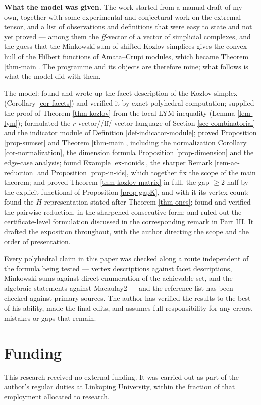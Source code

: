 \documentclass[11pt, a4paper, abstract=yes]{scrartcl}
\theoremstyle{definition}
\theoremstyle{remark}
\theoremstyle{plain}
\begin{document}
\textbf{What the model was given.} The work started from a manual draft of my own, together with some
experimental and conjectural work on the extremal tensor, and a list of observations and
definitions that were easy to state and not yet proved --- among them the \emph{ff}-vector of a vector
of simplicial complexes, and the guess that the Minkowski sum of shifted Kozlov simplices gives the
convex hull of the Hilbert functions of Amata--Crupi modules, which became Theorem \ref{thm-main}.
The programme and its objects are therefore mine; what follows is what the model did with them.

The model: found and wrote up the facet description of the Kozlov simplex (Corollary \ref{cor-facets})
and verified it by exact polyhedral computation; supplied the proof of Theorem \ref{thm-kozlov} from the
local LYM inequality (Lemma \ref{lem-lym}); formulated the \(r\)-vector//ff/-vector language of
Section \ref{sec-combinatorial} and the indicator module of Definition \ref{def-indicator-module}; proved
Proposition \ref{prop-sumset} and Theorem \ref{thm-main}, including the normalization
Corollary \ref{cor-normalization}, the dimension formula Proposition \ref{prop-dimension} and the edge-case
analysis; found Example \ref{ex-nonids}, the sharper Remark \ref{rem-ac-reduction} and
Proposition \ref{prop-in-ids}, which together fix the scope of the main theorem; and proved Theorem \ref{thm-kozlov-matrix} in full, the
gap-\(\ge2\) half by the explicit functional of Proposition \ref{prop-gapK}, and with it
its vertex count; found the \(H\)-representation stated after Theorem \ref{thm-ones}; found and
verified the pairwise reduction, in the sharpened consecutive form; and ruled out the
certificate-level formulation discussed in the corresponding remark in Part III. It
drafted the exposition throughout, with the author directing the scope and the order of
presentation.

Every polyhedral claim in this paper was checked along a route independent of the formula being
tested --- vertex descriptions against facet descriptions, Minkowski sums against direct enumeration
of the achievable set, and the algebraic statements against Macaulay2 --- and the reference list has
been checked against primary sources. The author has verified the results to the best of his ability,
made the final edits, and assumes full responsibility for any errors, mistakes or gaps that remain.
\section*{Funding}
\label{sec:orgd9ef00f}
This research received no external funding. It was carried out as part of the author's regular duties
at Linköping University, within the fraction of that employment allocated to research.
\end{document}
